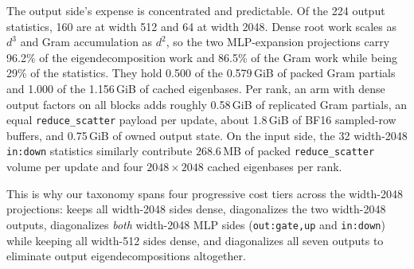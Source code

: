 The output side's expense is concentrated and predictable. Of the 224 output
statistics, 160 are at width 512 and 64 at width 2048. Dense root work scales as
$d^3$ and Gram accumulation as $d^2$, so the two MLP-expansion projections carry
96.2\% of the eigendecomposition work and 86.5\% of the Gram work while being
29\% of the statistics. They hold 0.500 of the 0.579\,GiB of packed Gram
partials and 1.000 of the 1.156\,GiB of cached eigenbases. Per rank, an arm with
dense output factors on all blocks adds roughly 0.58\,GiB of replicated Gram
partials, an equal \verb|reduce_scatter| payload per update, about 1.8\,GiB of
BF16 sampled-row buffers, and 0.75\,GiB of owned output state. On the input
side, the 32 width-2048 \texttt{in:down} statistics similarly contribute
$268.6$\,MB of packed \verb|reduce_scatter| volume per update and four
$2048\times 2048$ cached eigenbases per rank.

This is why our taxonomy spans four progressive cost tiers across the width-2048
projections:  keeps all width-2048 sides dense, 
diagonalizes the two width-2048 outputs,  diagonalizes
\emph{both} width-2048 MLP sides (\texttt{out:gate,up} and \texttt{in:down})
while keeping all width-512 sides dense, and  diagonalizes all
seven outputs to eliminate output eigendecompositions altogether.
